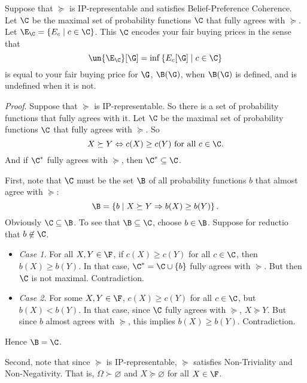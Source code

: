 \begin{theorem}
Suppose that $\succeq$ is IP-representable and satisfies Belief-Preference Coherence. Let $\C$ be the maximal set of probability functions $\C$ that fully agrees with $\succeq$. Let $\E_\C=\{E_c \mathrel{|} c\in\C\}$. This $\C$ encodes your fair buying prices in the sense that
$$ \un{\E_\C}[\G]=\inf\left\{E_c[\G] \mathrel{|} c\in\C\right\} $$
is equal to your fair buying price for $\G$, $\B(\G)$, when $\B(\G)$ is defined, and is undefined when it is not.
\end{theorem}

\noindent\textit{Proof}. Suppose that $\succeq$ is IP-representable. So there is a set of probability functions that fully agrees with it. Let $\C$ be the maximal set of probability functions $\C$ that fully agrees with $\succeq$. So
$$ X\succeq Y \Leftrightarrow c(X)\geq c(Y) \text{ for all } c\in\C. $$
And if $\C^*$ fully agrees with $\succeq$, then $\C^*\subseteq\C$.

First, note that $\C$ must be the set $\B$ of all probability functions $b$ that almost agree with $\succeq$:
$$ \B=\left\{b \mathrel{|} X\succeq Y \Rightarrow b(X)\geq b(Y)\right\}. $$
Obviously $\C\subseteq\B$. To see that $\B\subseteq\C$, choose $b\in\B$. Suppose for reductio that $b\not\in\C$.
\begin{itemize}
\item[]\textit{Case 1.} For all $X,Y\in\F$, if $c(X)\geq c(Y)$ for all $c\in\C$, then $b(X)\geq b(Y)$. In that case, $\C^*=\C\cup\{b\}$ fully agrees with $\succeq$. But then $\C$ is not maximal. Contradiction.
\item[]\textit{Case 2.} For some $X,Y\in\F$, $c(X)\geq c(Y)$ for all $c\in\C$, but $b(X)<b(Y)$. In that case, since $\C$ fully agrees with $\succeq$, $X\succeq Y$. But since $b$ almost agrees with $\succeq$, this implies $b(X)\geq b(Y)$. Contradiction.
\end{itemize}
Hence $\B=\C$.

Second, note that since $\succeq$ is IP-representable, $\succeq$ satisfies Non-Triviality and Non-Negativity. That is, $\Omega\succ \varnothing$ and $X\succeq \varnothing$ for all $X\in\F$.

